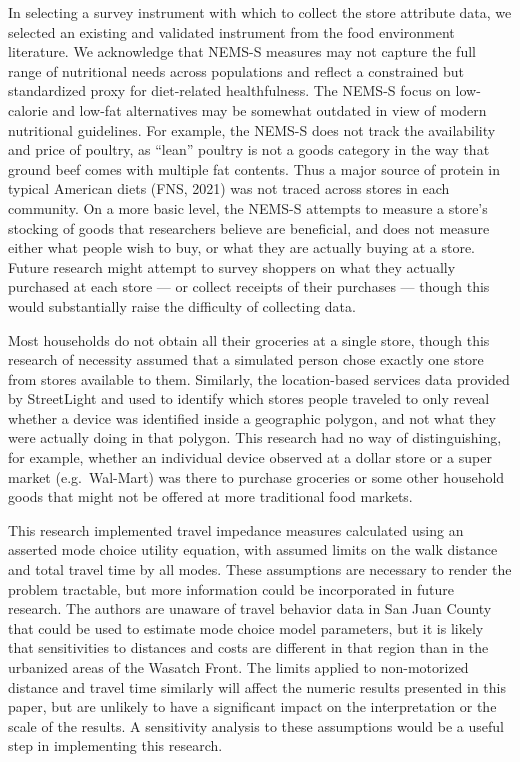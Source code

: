 \documentclass[
  letterpaper,
  number,
  review,
  3p]{elsarticle}
\begin{document}
In selecting a survey instrument with which to collect the store
attribute data, we selected an existing and validated instrument from
the food environment literature. We acknowledge that NEMS-S measures may
not capture the full range of nutritional needs across populations and
reflect a constrained but standardized proxy for diet-related
healthfulness. The NEMS-S focus on low-calorie and low-fat alternatives
may be somewhat outdated in view of modern nutritional guidelines. For
example, the NEMS-S does not track the availability and price of
poultry, as ``lean'' poultry is not a goods category in the way that
ground beef comes with multiple fat contents. Thus a major source of
protein in typical American diets (FNS, 2021) was not traced across
stores in each community. On a more basic level, the NEMS-S attempts to
measure a store's stocking of goods that researchers believe are
beneficial, and does not measure either what people wish to buy, or what
they are actually buying at a store. Future research might attempt to
survey shoppers on what they actually purchased at each store --- or
collect receipts of their purchases --- though this would substantially
raise the difficulty of collecting data.

Most households do not obtain all their groceries at a single store,
though this research of necessity assumed that a simulated person chose
exactly one store from stores available to them. Similarly, the
location-based services data provided by StreetLight and used to
identify which stores people traveled to only reveal whether a device
was identified inside a geographic polygon, and not what they were
actually doing in that polygon. This research had no way of
distinguishing, for example, whether an individual device observed at a
dollar store or a super market (e.g.~Wal-Mart) was there to purchase
groceries or some other household goods that might not be offered at
more traditional food markets.

This research implemented travel impedance measures calculated using an
asserted mode choice utility equation, with assumed limits on the walk
distance and total travel time by all modes. These assumptions are
necessary to render the problem tractable, but more information could be
incorporated in future research. The authors are unaware of travel
behavior data in San Juan County that could be used to estimate mode
choice model parameters, but it is likely that sensitivities to
distances and costs are different in that region than in the urbanized
areas of the Wasatch Front. The limits applied to non-motorized distance
and travel time similarly will affect the numeric results presented in
this paper, but are unlikely to have a significant impact on the
interpretation or the scale of the results. A sensitivity analysis to
these assumptions would be a useful step in implementing this research.
\end{document}
